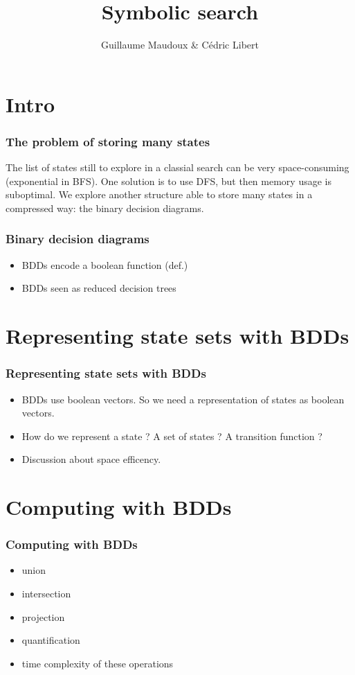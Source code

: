 \documentclass[10pt,a4paper]{beamer}
\author{Guillaume Maudoux \& Cédric Libert}
\title{Symbolic search}
\begin{document}
\maketitle
\begin{frame}
\tableofcontents
\end{frame}
\section{Intro}
\begin{frame}
\frametitle{The problem of storing many states}

The list of states still to explore in a classial search can be very space-consuming (exponential in BFS).  One solution is to use DFS, but then memory usage is suboptimal.  We explore another structure able to store many states in a compressed way: the binary decision diagrams.

\end{frame}

\begin{frame}
\frametitle{Binary decision diagrams}

\begin{itemize}
\item BDDs encode a boolean function (def.)
\item BDDs seen as reduced decision trees
\end{itemize}

\end{frame}
\section{Representing  state sets with BDDs}
\begin{frame}
\frametitle{Representing  state sets with BDDs}
	\begin{itemize}
	\item BDDs use boolean vectors.  So we need a representation of states as boolean vectors.
	\item How do we represent a state ? A set of states ? A transition function ?
	\item Discussion about space efficency.
	\end{itemize}
\end{frame}

\section{Computing with BDDs}
\begin{frame}
\frametitle{Computing with BDDs}

\begin{itemize}
\item union
\item intersection
\item projection
\item quantification
\item time complexity of these operations
\end{itemize}

\end{frame}
\end{document}

